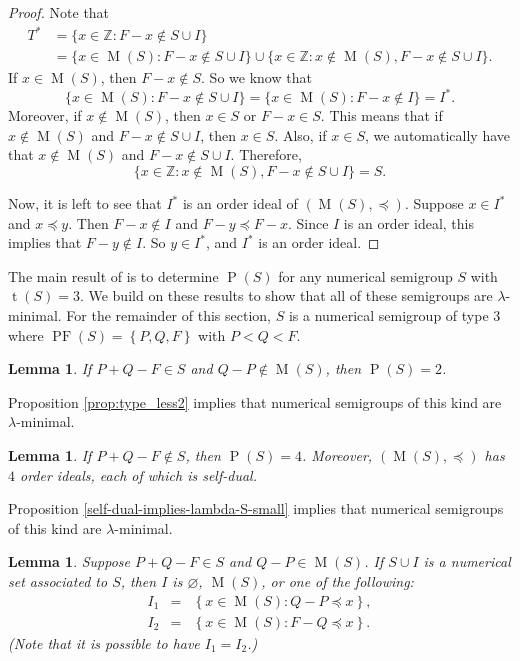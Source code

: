 \documentclass{amsproc}
\newcommand{\set}[1]{\left\{#1 \right\}}
\DeclareMathOperator{\PF}{PF}
\DeclareMathOperator{\Pa}{P}
\DeclareMathOperator{\type}{t}
\DeclareMathOperator{\M}{M}
\newtheorem{lemma}[theorem]{Lemma}
\theoremstyle{definition}
\theoremstyle{remark}
\numberwithin{equation}{section}
\begin{document}
\begin{proof}\label{i_star}
Note that
\begin{align*}
T^*&=\{x\in\mathbb{Z}: F-x\notin S\cup I\}\\
&=\{x\in \M(S): F-x\notin S\cup I\} \cup \{x\in\mathbb{Z}: x\not\in \M(S), F-x\notin S\cup I\}.
\end{align*}
If $x\in \M(S)$, then $F-x\notin S$. So we know that
\[\{x\in \M(S): F-x\notin S\cup I\}=\{x\in \M(S): F-x\notin  I\}=I^*.\]
Moreover, if $x\notin \M(S)$, then $x\in S$ or $F-x\in S$. This means that if $x\notin \M(S)$ and $F-x\notin S\cup I$, then $x\in S$. Also, if $x\in S$, we automatically have that $x\notin \M(S)$ and $F-x\notin S\cup I$.
Therefore,
\[\{x\in\mathbb{Z}: x\not\in \M(S), F-x\notin S\cup I\}
=S.\]


    
    Now, it is left to see that $I^*$ is an order ideal of $(\M(S),\preccurlyeq)$. Suppose $x \in I^*$ and $x \preceq y$. Then $F-x\notin I$ and $F-y\preccurlyeq F-x$. Since $I$ is an order ideal, this implies that $F-y \notin I$. So $y \in I^*$, and $I^*$ is an order ideal. 
\end{proof}

The main result of \cite[Section 6]{chen2023enumeratingnumericalsetsassociated} is to determine $\Pa(S)$ for any numerical semigroup $S$ with $\type(S) = 3$.  We build on these results to show that all of these semigroups are $\lambda$-minimal. 
For the remainder of this section, $S$ is a numerical semigroup of type $3$ where $\PF(S) = \set{ P, Q, F}$ with $P<Q<F$. 


\begin{lemma}\cite[Lemma 6.2]{chen2023enumeratingnumericalsetsassociated}
    \label{type 3 p(s) 2}
    If $P+Q-F\in S$ and $Q-P \notin \M(S)$, then $\Pa(S) = 2$.
\end{lemma}
Proposition \ref{prop:type_less2} implies that numerical semigroups of this kind are $\lambda$-minimal.

\begin{lemma}\cite[Lemma 6.1]{chen2023enumeratingnumericalsetsassociated}
    \label{type 3 4 self dual}
    If $P+Q-F \notin S$, then $\Pa(S)=4$. Moreover, $(\M(S),\preccurlyeq)$ has $4$ order ideals, each of which is self-dual.
\end{lemma}
Proposition \ref{self-dual-implies-lambda-S-small} implies that numerical semigroups of this kind are $\lambda$-minimal.



\begin{lemma}\cite[Lemma 6.4]{chen2023enumeratingnumericalsetsassociated}
    \label{type 3 ideals case}
    Suppose $P+Q-F \in S$ and $Q-P \in \M(S)$. If $S\cup I$ is a numerical set associated to $S$, then $I$ is $\varnothing$, $\M(S)$, or one of the following:   
    \begin{eqnarray*}
    I_1 & = &  \set{x\in \M(S) \colon Q-P \preccurlyeq x}, \\
    I_2 & = & \set{x\in \M(S) \colon F-Q \preccurlyeq x}.
    \end{eqnarray*}
    (Note that it is possible to have $I_1 = I_2$.) 
\end{lemma}
\end{document}

